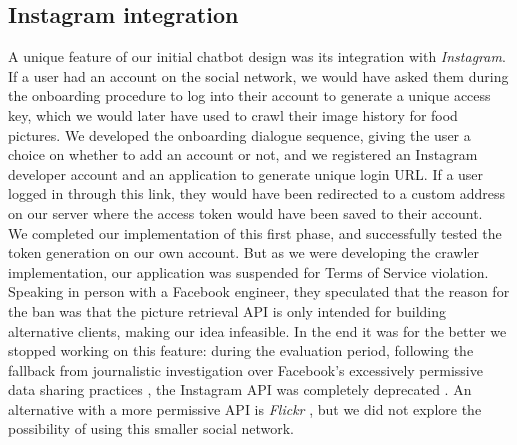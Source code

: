 \subsection{Instagram integration}
A unique feature of our initial chatbot design was its integration with \textit{Instagram}. If a user had an account on the social network, we would have asked them during the onboarding procedure to log into their account to generate a unique access key, which we would later have used to crawl their image history for food pictures.
We developed the onboarding dialogue sequence, giving the user a choice on whether to add an account or not, and we registered an Instagram developer account and an application to generate unique login URL. If a user logged in through this link, they would have been redirected to a custom address on our server where the access token would have been saved to their account. \\
We completed our implementation of this first phase, and successfully tested the token generation on our own account. But as we were developing the crawler implementation, our application was suspended for Terms of Service violation. Speaking in person with a Facebook engineer, they speculated that the reason for the ban was that the picture retrieval API is only intended for building alternative clients, making our idea infeasible. In the end it was for the better we stopped working on this feature: during the evaluation period, following the fallback from journalistic investigation over Facebook's excessively permissive data sharing practices \cite{cambridgeanalytica}, the Instagram API was completely deprecated \cite{instagramdeprecated}.
An alternative with a more permissive API is \textit{Flickr} \cite{flickr}, but we did not explore the possibility of using this smaller social network.
